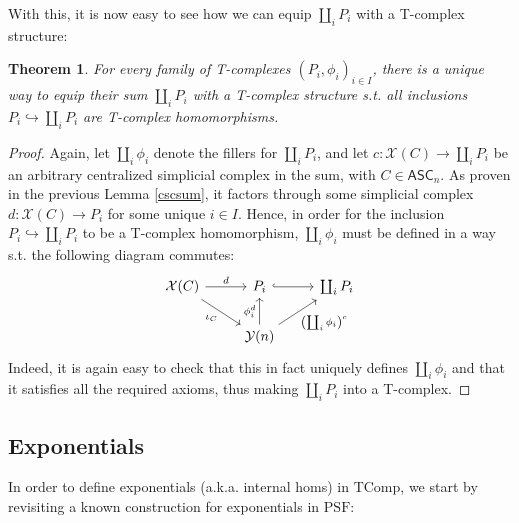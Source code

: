 \documentclass{article}
\newtheorem{theorem}{Theorem}[subsection]
\theoremstyle{remark}
\theoremstyle{definition}
\newcommand{\PSF}{\mathrm{PSF}}
\newcommand{\ASC}{\mathsf{ASC}}
\newcommand{\Y}{\mathcal Y}
\newcommand{\X}{\mathcal X}
\newcommand{\TComp}{\mathrm{TComp}}
\begin{document}
	With this, it is now easy to see how we can equip $\coprod_iP_i$ with a T-complex structure:
	\begin{theorem}
		For every family of T-complexes $(P_i,\phi_i)_{i\in I}$, there is a unique way to equip their sum $\coprod_iP_i$ with a T-complex structure s.t. all inclusions $P_i\hookrightarrow\coprod_iP_i$ are T-complex homomorphisms.
	\end{theorem}
	\begin{proof}
		Again, let $\coprod_i\phi_i$ denote the fillers for $\coprod_iP_i$, and let $c:\X(C)\to\coprod_iP_i$ be an arbitrary centralized simplicial complex in the sum, with $C\in\ASC_n$. As proven in the previous Lemma \ref{cscsum}, it factors through some simplicial complex $d:\X(C)\to P_i$ for some unique $i\in I$. Hence, in order for the inclusion $P_i\hookrightarrow\coprod_iP_i$ to be a T-complex homomorphism, $\coprod_i\phi_i$ must be defined in a way s.t. the following diagram commutes:
		\[\begin{tikzcd}
			\X(C)\arrow{r}{d}\arrow{dr}[swap]{\iota_C}&P_i\arrow[hook]{r}&\coprod_iP_i\\
			&\Y(n)\arrow{u}{\phi_i^d}\arrow{ur}[swap]{\left(\coprod_i\phi_i\right)^c}
		\end{tikzcd}\]
		Indeed, it is again easy to check that this in fact uniquely defines $\coprod_i\phi_i$ and that it satisfies all the required axioms, thus making $\coprod_iP_i$ into a T-complex.
	\end{proof}
	\subsection{Exponentials}
	In order to define exponentials (a.k.a. internal homs) in $\TComp$, we start by revisiting a known construction for exponentials in $\PSF$:
\end{document}
